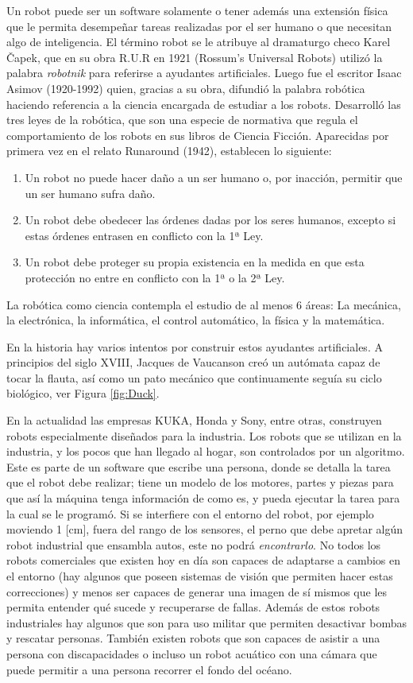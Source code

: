 Un robot puede ser un software solamente o tener además una extensión física que le permita desempeñar tareas realizadas por el ser humano o que necesitan algo de inteligencia. El término robot se le atribuye al dramaturgo checo Karel Čapek, que en su obra R.U.R en 1921 (Rossum’s Universal Robots) utilizó la palabra \textit{robotnik} para referirse a ayudantes artificiales. Luego fue el escritor Isaac Asimov (1920-1992) quien,  gracias a su obra, difundió la palabra robótica haciendo referencia a la ciencia encargada de estudiar a los robots. Desarrolló las tres leyes de la robótica, que son una especie de normativa que regula el comportamiento de los robots en sus libros de Ciencia Ficción. Aparecidas por primera vez en el relato Runaround (1942), establecen lo siguiente:\begin{enumerate}
\item Un robot no puede hacer daño a un ser humano o, por inacción, permitir que un ser humano sufra daño.
\item Un robot debe obedecer las órdenes dadas por los seres humanos, excepto si estas órdenes entrasen en conflicto con la 1ª Ley.
\item Un robot debe proteger su propia existencia en la medida en que esta protección no entre en conflicto con la 1ª o la 2ª Ley.
\end{enumerate}
La robótica como ciencia contempla el estudio de al menos 6 áreas: La mecánica, la electrónica, la informática, el control automático, la física y la matemática.

En la historia hay varios intentos por construir estos ayudantes artificiales. A principios del siglo XVIII, Jacques de Vaucanson creó un autómata capaz de tocar la flauta, así como un pato mecánico que continuamente seguía su ciclo biológico, ver Figura \ref{fig:Duck}.

En la actualidad las empresas KUKA, Honda y Sony, entre otras, construyen robots especialmente diseñados para la industria. Los robots que se utilizan en la industria, y los pocos que han llegado al hogar, son controlados por un algoritmo. Este es parte de un software que escribe una persona, donde se detalla la tarea que el robot debe realizar; tiene un modelo de los motores, partes y piezas para que así la máquina tenga información de como es, y pueda ejecutar la tarea para la cual se le programó. Si se interfiere con el entorno del robot, por ejemplo moviendo 1 [cm], fuera del rango de los sensores, el perno que debe apretar algún robot industrial que ensambla autos, este no podrá \textit{encontrarlo}. No todos los robots comerciales que existen hoy en día son capaces de adaptarse a cambios en el entorno (hay algunos que poseen sistemas de visión que permiten hacer estas correcciones) y menos ser capaces de generar una imagen de sí mismos que les permita entender qué sucede y recuperarse de fallas. Además de estos robots industriales hay algunos que son para uso militar que permiten desactivar bombas y rescatar personas. También existen robots que son capaces de asistir a una persona con discapacidades o incluso un robot acuático con una cámara que puede permitir a una persona recorrer el fondo del océano. 

